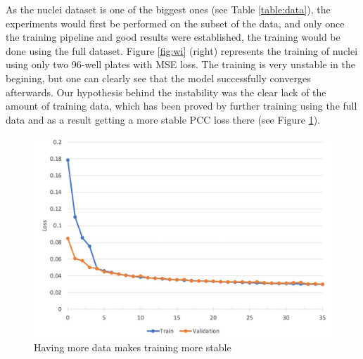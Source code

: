 

As the nuclei dataset is one of the biggest ones (see Table \ref{table:data}), the experiments would first be performed on the subset of the data, and only once the training pipeline and good results were established, the training would be done using the full dataset. Figure \ref{fig:wi} (right) represents the training of nuclei using only two 96-well plates with MSE loss. The training is very unstable in the begining, but one can clearly see that the model successfully converges afterwards. Our hypothesis behind the instability was the clear lack of the amount of training data, which has been proved by further training using the full data and as a result getting a more stable PCC loss there (see Figure \ref{fig:full-dataset-pcc}).

\begin{figure}[H]
	\begin{center}
		\includegraphics[width=0.8\linewidth]{bilder/nuclei/full-dataset.jpg}
		\caption{Having more data makes training more stable}\label{fig:full-dataset-pcc}
	\end{center}
\end{figure}

